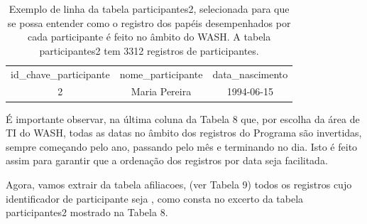 \documentclass[
12pt,		%
openright,	%
twoside,  %
a4paper,			%
chapter=TITLE,		%
english,			%
french,				%
spanish,			%
brazil				%
]{USPSC-classe/USPSC}
\begin{document}
\begin{table}[htb]
\tiny
\caption{\label{96081f1bc28f7c738012f4beb3ef867b6b67107f}Exemplo de linha da tabela participantes2, selecionada para que se possa entender como o registro dos pap\'eis desempenhados por cada participante \'e feito no \^ambito do WASH. A tabela participantes2 tem 3312 registros de participantes.}

\centering
\begin{tabular}{|c|c|c|}
\hline
id\_chave\_participante  &  nome\_participante             &  data\_nascimento  \\
                     2  &  Maria Pereira  &  1994-06-15 \\
\hline
\end{tabular}
\end{table}


\'E importante observar, na \'ultima coluna da Tabela 8 que, por escolha da \'area de TI do WASH, todas as datas no \^ambito dos registros do Programa s\~ao invertidas, sempre come\c{c}ando pelo ano, passando pelo m\^es e terminando no dia. Isto \'e feito assim para garantir que a ordena\c{c}\~ao dos registros por data seja facilitada.









Agora, vamos extrair da tabela \textquotedbl afiliacoes\textquotedbl , (ver Tabela 9) todos os registros cujo identificador de participante seja  \textquotedbl , como consta no excerto da tabela participantes2 mostrado na Tabela 8.
\end{document}
